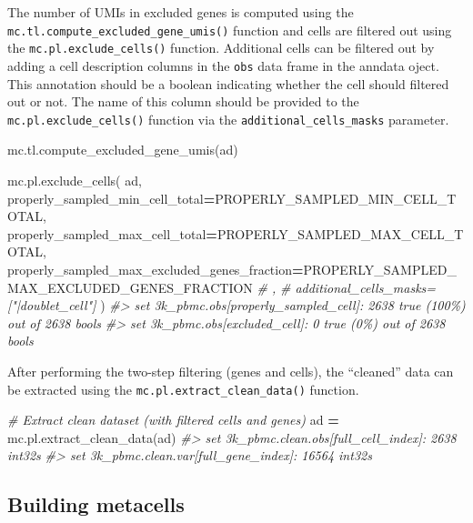 \documentclass[
]{book}
\newenvironment{Shaded}{\begin{snugshade}}{\end{snugshade}}
\newcommand{\CommentTok}[1]{\textcolor[rgb]{0.56,0.35,0.01}{\textit{#1}}}
\newcommand{\NormalTok}[1]{#1}
\newcommand{\OperatorTok}[1]{\textcolor[rgb]{0.81,0.36,0.00}{\textbf{#1}}}
\begin{document}
The number of UMIs in excluded genes is computed using the \texttt{mc.tl.compute\_excluded\_gene\_umis()} function and cells are filtered out using the \texttt{mc.pl.exclude\_cells()} function.
Additional cells can be filtered out by adding a cell description columns in the \texttt{obs} data frame in the anndata oject. This annotation should be a boolean indicating whether the cell should filtered out or not.
The name of this column should be provided to the \texttt{mc.pl.exclude\_cells()} function via the \texttt{additional\_cells\_masks} parameter.

\begin{Shaded}
\begin{Highlighting}[]
\NormalTok{mc.tl.compute\_excluded\_gene\_umis(ad)}

\NormalTok{mc.pl.exclude\_cells(}
\NormalTok{    ad,}
\NormalTok{    properly\_sampled\_min\_cell\_total}\OperatorTok{=}\NormalTok{PROPERLY\_SAMPLED\_MIN\_CELL\_TOTAL,}
\NormalTok{    properly\_sampled\_max\_cell\_total}\OperatorTok{=}\NormalTok{PROPERLY\_SAMPLED\_MAX\_CELL\_TOTAL,}
\NormalTok{    properly\_sampled\_max\_excluded\_genes\_fraction}\OperatorTok{=}\NormalTok{PROPERLY\_SAMPLED\_MAX\_EXCLUDED\_GENES\_FRACTION }\CommentTok{\# ,}
    \CommentTok{\# additional\_cells\_masks=["|doublet\_cell"]}
\NormalTok{)}
\CommentTok{\#\textgreater{} set 3k\_pbmc.obs[properly\_sampled\_cell]: 2638 true (100\%) out of 2638 bools}
\CommentTok{\#\textgreater{} set 3k\_pbmc.obs[excluded\_cell]: 0 true (0\%) out of 2638 bools}
\end{Highlighting}
\end{Shaded}

After performing the two-step filtering (genes and cells), the ``cleaned'' data can be extracted using the \texttt{mc.pl.extract\_clean\_data()} function.

\begin{Shaded}
\begin{Highlighting}[]
\CommentTok{\# Extract clean dataset (with filtered cells and genes)}
\NormalTok{ad }\OperatorTok{=}\NormalTok{ mc.pl.extract\_clean\_data(ad)}
\CommentTok{\#\textgreater{} set 3k\_pbmc.clean.obs[full\_cell\_index]: 2638 int32s}
\CommentTok{\#\textgreater{} set 3k\_pbmc.clean.var[full\_gene\_index]: 16564 int32s}
\end{Highlighting}
\end{Shaded}

\hypertarget{building-metacells}{%
\subsection{Building metacells}\label{building-metacells}}
\end{document}
